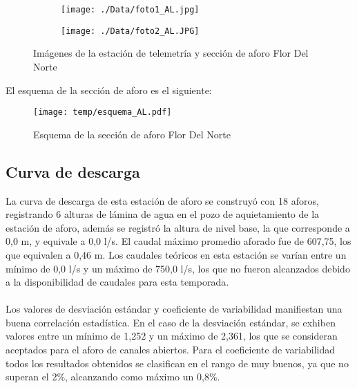 \documentclass[]{article}
\begin{document}
\begin{figure}[H]
  \centering
\begin{subfigure}{.49\textwidth}
  \texttt{[image: ./Data/foto1\_AL.jpg]}
\end{subfigure}
\hfill
\begin{subfigure}{.49\textwidth}
  \texttt{[image: ./Data/foto2\_AL.JPG]}
\end{subfigure}
\caption{Imágenes de la estación de telemetría y sección de aforo Flor Del Norte}
\label{fig:fotos_12}
\end{figure}

El esquema de la sección de aforo es el siguiente:

\begin{figure}[H]
  \centering
  \texttt{[image: temp/esquema\_AL.pdf]}
\caption{Esquema de la sección de aforo Flor Del Norte}
\label{fig:Esquema_AL}
\end{figure}

\subsection{Curva de descarga}\label{curva-de-descarga-11}

La curva de descarga de esta estación de aforo se construyó con 18 aforos, registrando 6 alturas de lámina de agua en el pozo de aquietamiento de la estación de aforo, además se registró la altura de nivel base, la que corresponde a 0,0 m, y equivale a 0,0 l/s. El caudal máximo promedio aforado fue de 607,75, los que equivalen a 0,46 m. Los caudales teóricos en esta estación se varían entre un mínimo de 0,0 l/s y un máximo de 750,0 l/s, los que no fueron alcanzados debido a la disponibilidad de caudales para esta temporada.\\
\\
Los valores de desviación estándar y coeficiente de variabilidad manifiestan una buena correlación estadística. En el caso de la desviación estándar, se exhiben valores entre un mínimo de 1,252 y un máximo de 2,361, los que se consideran aceptados para el aforo de canales abiertos. Para el coeficiente de variabilidad todos los resultados obtenidos se clasifican en el rango de muy buenos, ya que no superan el 2\%, alcanzando como máximo un 0,8\%.
\end{document}
